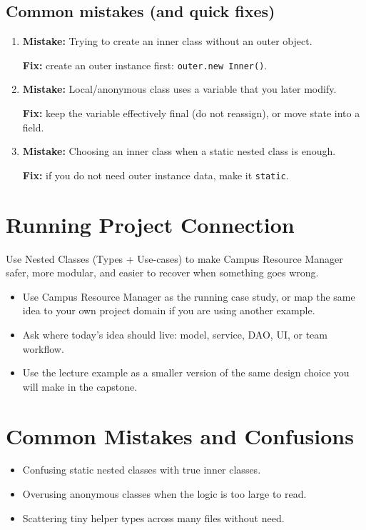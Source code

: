 \documentclass[11pt]{article}
\begin{document}
\subsection{Common mistakes (and quick fixes)}
\begin{enumerate}
  \item \textbf{Mistake:} Trying to create an inner class without an outer object.\par
  \textbf{Fix:} create an outer instance first: \texttt{outer.new Inner()}.

  \item \textbf{Mistake:} Local/anonymous class uses a variable that you later modify.\par
  \textbf{Fix:} keep the variable effectively final (do not reassign), or move state into a field.

  \item \textbf{Mistake:} Choosing an inner class when a static nested class is enough.\par
  \textbf{Fix:} if you do not need outer instance data, make it \texttt{static}.
\end{enumerate}

\section{Running Project Connection}
Use Nested Classes (Types + Use-cases) to make Campus Resource Manager safer, more modular, and easier to recover when something goes wrong.
\begin{itemize}
  \item Use Campus Resource Manager as the running case study, or map the same idea to your own project domain if you are using another example.
  \item Ask where today's idea should live: model, service, DAO, UI, or team workflow.
  \item Use the lecture example as a smaller version of the same design choice you will make in the capstone.
\end{itemize}
\notesources{\OOPSUnitIIISources}

\section{Common Mistakes and Confusions}
\begin{itemize}
  \item Confusing static nested classes with true inner classes.
  \item Overusing anonymous classes when the logic is too large to read.
  \item Scattering tiny helper types across many files without need.
\end{itemize}
\notesources{\OOPSUnitIIISources}
\end{document}
